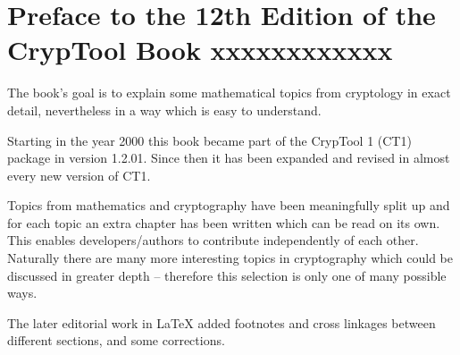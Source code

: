
\clearpage{}
{}
\chapter*{Preface to the 12th Edition of the CrypTool Book xxxxxxxxxxxx}

The book's goal is to explain some mathematical topics from cryptology in
exact detail, nevertheless in a way which is easy to understand.

Starting in the year 2000 this book became part of the CrypTool 1
(CT1) package in version 1.2.01. 
Since then it has been expanded and revised in almost every new version of CT1.

Topics from mathematics and cryptography have been meaningfully split up and
for each topic an extra chapter has been written which can be read on its own.
This enables developers/authors to contribute independently of each other.
Naturally there are many more interesting topics in cryptography which could
be discussed in greater depth -- therefore this selection is only one of many
possible ways.

The later editorial work in LaTeX added footnotes and cross linkages between
different sections, and some corrections.

